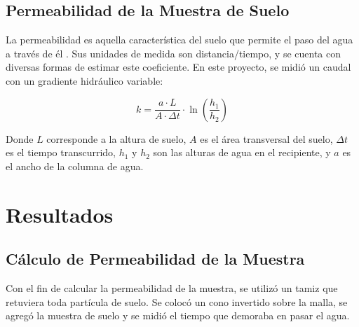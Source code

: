 \subsection{Permeabilidad de la Muestra de Suelo}

La permeabilidad es aquella característica del suelo que permite el paso del agua a través de él \citep{permeabilidad_suelos}. Sus unidades de medida son distancia/tiempo, y se cuenta con diversas formas de estimar este coeficiente. En este proyecto, se midió un caudal con un gradiente hidráulico variable:

\begin{equation}
    k = \frac{a \cdot L}{A \cdot \Delta t} \cdot \ln\left(\frac{h_1}{h_2}\right)
\end{equation}

Donde \(L\) corresponde a la altura de suelo, \(A\) es el área transversal del suelo, \(\Delta t\) es el tiempo transcurrido, \(h_1\) y \(h_2\) son las alturas de agua en el recipiente, y \(a\) es el ancho de la columna de agua.

\newpage
\section{Resultados}

\subsection{Cálculo de Permeabilidad de la Muestra}

Con el fin de calcular la permeabilidad de la muestra, se utilizó un tamiz que retuviera toda partícula de suelo. Se colocó un cono invertido sobre la malla, se agregó la muestra de suelo y se midió el tiempo que demoraba en pasar el agua.

